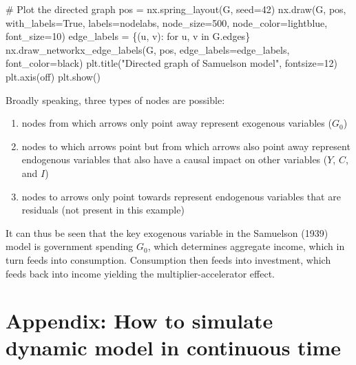 \documentclass[
  letterpaper,
  DIV=11,
  numbers=noendperiod]{scrreprt}
\newenvironment{Shaded}{\begin{snugshade}}{\end{snugshade}}
\newcommand{\CommentTok}[1]{\textcolor[rgb]{0.37,0.37,0.37}{#1}}
\newcommand{\ControlFlowTok}[1]{\textcolor[rgb]{0.00,0.23,0.31}{#1}}
\newcommand{\DecValTok}[1]{\textcolor[rgb]{0.68,0.00,0.00}{#1}}
\newcommand{\KeywordTok}[1]{\textcolor[rgb]{0.00,0.23,0.31}{#1}}
\newcommand{\NormalTok}[1]{\textcolor[rgb]{0.00,0.23,0.31}{#1}}
\newcommand{\OperatorTok}[1]{\textcolor[rgb]{0.37,0.37,0.37}{#1}}
\newcommand{\StringTok}[1]{\textcolor[rgb]{0.13,0.47,0.30}{#1}}
\newcommand{\VariableTok}[1]{\textcolor[rgb]{0.07,0.07,0.07}{#1}}
\providecommand{\tightlist}{%
  \setlength{\itemsep}{0pt}\setlength{\parskip}{0pt}}\usepackage{longtable,booktabs,array}
\begin{document}
\begin{tcolorbox}
\begin{Shaded}
\begin{Highlighting}[]
\CommentTok{\# Plot the directed graph}
\NormalTok{pos }\OperatorTok{=}\NormalTok{ nx.spring\_layout(G, seed}\OperatorTok{=}\DecValTok{42}\NormalTok{)  }
\NormalTok{nx.draw(G, pos, with\_labels}\OperatorTok{=}\VariableTok{True}\NormalTok{, labels}\OperatorTok{=}\NormalTok{nodelabs, node\_size}\OperatorTok{=}\DecValTok{500}\NormalTok{, node\_color}\OperatorTok{=}\StringTok{\textquotesingle{}lightblue\textquotesingle{}}\NormalTok{, font\_size}\OperatorTok{=}\DecValTok{10}\NormalTok{)}
\NormalTok{edge\_labels }\OperatorTok{=}\NormalTok{ \{(u, v): }\StringTok{\textquotesingle{}\textquotesingle{}} \ControlFlowTok{for}\NormalTok{ u, v }\KeywordTok{in}\NormalTok{ G.edges\}}
\NormalTok{nx.draw\_networkx\_edge\_labels(G, pos, edge\_labels}\OperatorTok{=}\NormalTok{edge\_labels, font\_color}\OperatorTok{=}\StringTok{\textquotesingle{}black\textquotesingle{}}\NormalTok{)}
\NormalTok{plt.title(}\StringTok{"Directed graph of Samuelson model"}\NormalTok{, fontsize}\OperatorTok{=}\DecValTok{12}\NormalTok{)}
\NormalTok{plt.axis(}\StringTok{\textquotesingle{}off\textquotesingle{}}\NormalTok{)}
\NormalTok{plt.show()}
\end{Highlighting}
\end{Shaded}

\end{tcolorbox}

Broadly speaking, three types of nodes are possible:

\begin{enumerate}
\def\labelenumi{\arabic{enumi}.}
\tightlist
\item
  nodes from which arrows only point away represent exogenous variables
  (\(G_0\))
\item
  nodes to which arrows point but from which arrows also point away
  represent endogenous variables that also have a causal impact on other
  variables (\(Y\), \(C\), and \(I\))
\item
  nodes to arrows only point towards represent endogenous variables that
  are residuals (not present in this example)
\end{enumerate}

It can thus be seen that the key exogenous variable in the Samuelson
(1939) model is government spending \(G_0\), which determines aggregate
income, which in turn feeds into consumption. Consumption then feeds
into investment, which feeds back into income yielding the
multiplier-accelerator effect.

\section{Appendix: How to simulate dynamic model in continuous
time}\label{sec-sim-continuous}
\end{document}
